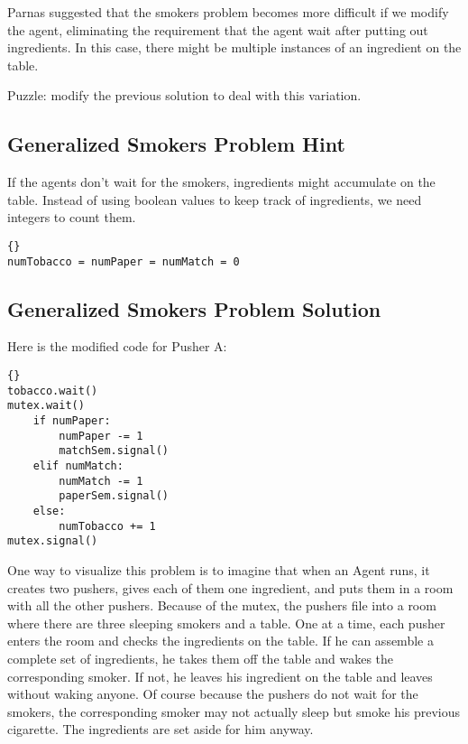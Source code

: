 \documentclass{book}
\newcommand{\clearemptydoublepage}{\newpage\cleardoublepage}
\begin{document}
Parnas suggested that the smokers problem becomes more
difficult if we modify the agent, eliminating the requirement
that the agent wait after putting out ingredients.  In this
case, there might be multiple instances of an ingredient on
the table.

Puzzle: modify the previous solution to deal with this
variation.

\clearemptydoublepage
\subsection{Generalized Smokers Problem Hint}

If the agents don't wait for the smokers, ingredients might
accumulate on the table.  Instead of using boolean values to
keep track of ingredients, we need integers to count them.

\begin{lstlisting}[title={Generalized Smokers problem hint}]{}
numTobacco = numPaper = numMatch = 0
\end{lstlisting}


\clearemptydoublepage
\subsection{Generalized Smokers Problem Solution}
\label{smoker}

Here is the modified code for Pusher A:

\begin{lstlisting}[title={Pusher A}]{}
tobacco.wait()
mutex.wait()
    if numPaper:
        numPaper -= 1
        matchSem.signal()
    elif numMatch:
        numMatch -= 1
        paperSem.signal()
    else: 
        numTobacco += 1
mutex.signal()
\end{lstlisting}

One way to visualize this problem is to imagine that when an
Agent runs, it creates two pushers, gives each of them one ingredient,
and puts them in a room with all the other pushers.  Because of the
mutex, the pushers file into a room where there are
three sleeping smokers and a table.  One at a time, each pusher enters
the room and checks the ingredients on the table.  If he can
assemble a complete set of ingredients, he takes them off the table
and wakes the corresponding smoker.  If not, he leaves his ingredient
on the table and leaves without waking anyone. Of course because the
pushers do not wait for the smokers, the corresponding smoker may not actually
sleep but smoke his previous cigarette. The ingredients are set aside
for him anyway.
\end{document}
